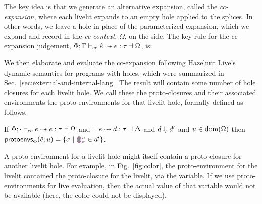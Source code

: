 The key idea is that we generate an alternative expansion,
called the \emph{cc-expansion}, 
where each livelit expands to an empty hole applied to the splices. In other words,
we leave a hole in place of the parameterized expansion, which we expand and record in the \emph{cc-context}, $\Omega$, on the side.
The key rule for the cc-expansion judgement, $\ccexpands{\Phi}{\Gamma}{\hat e}{e}{\tau}{\Omega}$, is:
\begin{mathpar}
\end{mathpar}

We then elaborate and evaluate the cc-expansion 
following Hazelnut Live's dynamic semantics for programs with holes, which were summarized 
in Sec.~\ref{sec:external-and-internal-lang}. The result will contain some number of hole closures
for each livelit hole. We call these the proto-closures and their associated environments the proto-environments for that livelit hole, formally defined as follows.
\begin{definition}
If $\ccexpands{\Phi}{\cdot}{\hat e}{e}{\tau}{\Omega}$ and $\elabs{}{e}{d}{\tau}{\Delta}$
and $\evalsTo{d}{d'}$ and $u \in \domof{\Omega}$ then $\protoEnvsOf{\Phi}{\hat e}{u} = \{ \sigma \mid \dehole{u}{\sigma} \in d' \}$.
\end{definition}
A proto-environment for a livelit hole might itself contain a proto-closure for another livelit hole.
For example, in Fig.~\ref{fig:color}, the proto-environment for the  livelit contained the 
proto-closure for the  livelit, via the  variable.
If we use proto-environments for live evaluation, then the actual value of that variable
would not be available (here, the color could not be displayed).

